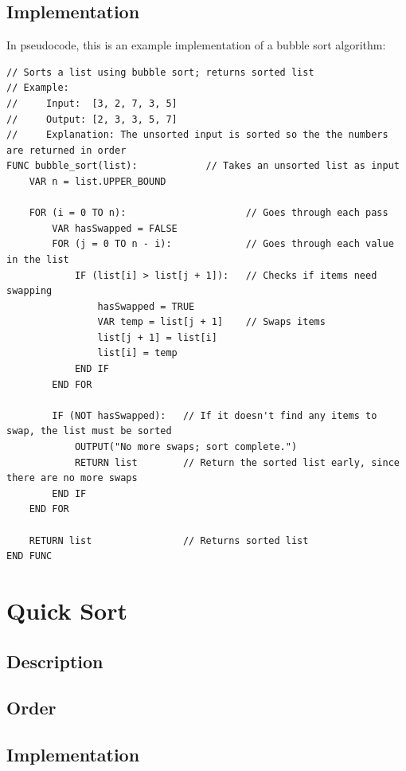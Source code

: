 \documentclass{book}
\begin{document}
            \subsection{Implementation}
                In pseudocode, this is an example implementation of a bubble sort algorithm:
                \begin{verbatim}
// Sorts a list using bubble sort; returns sorted list
// Example:
//     Input:  [3, 2, 7, 3, 5]
//     Output: [2, 3, 3, 5, 7]
//     Explanation: The unsorted input is sorted so the the numbers are returned in order
FUNC bubble_sort(list):            // Takes an unsorted list as input
    VAR n = list.UPPER_BOUND

    FOR (i = 0 TO n):                     // Goes through each pass
        VAR hasSwapped = FALSE
        FOR (j = 0 TO n - i):             // Goes through each value in the list
            IF (list[i] > list[j + 1]):   // Checks if items need swapping
                hasSwapped = TRUE
                VAR temp = list[j + 1]    // Swaps items
                list[j + 1] = list[i]
                list[i] = temp
            END IF
        END FOR

        IF (NOT hasSwapped):   // If it doesn't find any items to swap, the list must be sorted
            OUTPUT("No more swaps; sort complete.")
            RETURN list        // Return the sorted list early, since there are no more swaps
        END IF
    END FOR

    RETURN list                // Returns sorted list
END FUNC
                \end{verbatim}
        \newpage

        \section{Quick Sort}
            \subsection{Description}

            \subsection{Order}

            \subsection{Implementation}
\end{document}
